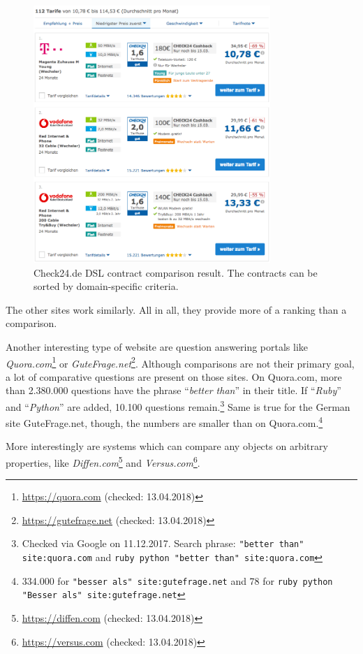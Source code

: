 \begin{figure}[tbp]
 \centering
	\includegraphics[width=0.8\textwidth]{images/ds-sys/check24_2}
	\caption{Check24.de DSL contract comparison result. The contracts can be sorted by domain-specific criteria.}
	\label{img:check24_2}
\end{figure}
The other sites work similarly. All in all, they provide more of a ranking than a comparison.


Another interesting type of website are question answering portals like \emph{Quora.com}\footnote{\url{https://quora.com} (checked: 13.04.2018)} or \emph{GuteFrage.net}\footnote{\url{https://gutefrage.net} (checked: 13.04.2018)}. Although comparisons are not their primary goal, a lot of comparative questions are present on those sites.
On Quora.com, more than 2.380.000 questions have the phrase \enquote{\emph{better than}} in their title. If \enquote{\emph{Ruby}} and \enquote{\emph{Python}} are added, 10.100 questions remain.\footnote{Checked via Google on 11.12.2017. Search phrase: \texttt{"better than" site:quora.com} and \texttt{ruby python "better than" site:quora.com}}
Same is true for the German site GuteFrage.net, though, the numbers are smaller than on Quora.com.\footnote{334.000 for \texttt{"besser als" site:gutefrage.net} and 78 for \texttt{ruby python "Besser als" site:gutefrage.net}}

More interestingly are systems which can compare any objects on arbitrary properties, like \emph{Diffen.com}\footnote{\url{https://diffen.com} (checked: 13.04.2018)} and \emph{Versus.com}\footnote{\url{https://versus.com} (checked: 13.04.2018)}.

